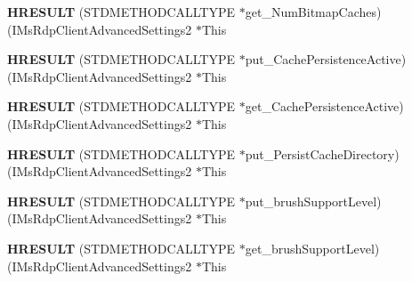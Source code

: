 \begin{DoxyCompactItemize}
\item 
\mbox{\label{struct_i_ms_rdp_client_advanced_settings2_vtbl_a17f2940a7e8ea17c9e679a1cb39da5b5}} 
{\bfseries H\+R\+E\+S\+U\+LT} (S\+T\+D\+M\+E\+T\+H\+O\+D\+C\+A\+L\+L\+T\+Y\+PE $\ast$get\+\_\+\+Num\+Bitmap\+Caches)(I\+Ms\+Rdp\+Client\+Advanced\+Settings2 $\ast$This
\item 
\mbox{\label{struct_i_ms_rdp_client_advanced_settings2_vtbl_a521bdd1f847274bd15432cf4052db173}} 
{\bfseries H\+R\+E\+S\+U\+LT} (S\+T\+D\+M\+E\+T\+H\+O\+D\+C\+A\+L\+L\+T\+Y\+PE $\ast$put\+\_\+\+Cache\+Persistence\+Active)(I\+Ms\+Rdp\+Client\+Advanced\+Settings2 $\ast$This
\item 
\mbox{\label{struct_i_ms_rdp_client_advanced_settings2_vtbl_a0a0d2c0b8585a6179e127e3e5e9a7b68}} 
{\bfseries H\+R\+E\+S\+U\+LT} (S\+T\+D\+M\+E\+T\+H\+O\+D\+C\+A\+L\+L\+T\+Y\+PE $\ast$get\+\_\+\+Cache\+Persistence\+Active)(I\+Ms\+Rdp\+Client\+Advanced\+Settings2 $\ast$This
\item 
\mbox{\label{struct_i_ms_rdp_client_advanced_settings2_vtbl_abddce74b590f074eb6a0cdf5706a206e}} 
{\bfseries H\+R\+E\+S\+U\+LT} (S\+T\+D\+M\+E\+T\+H\+O\+D\+C\+A\+L\+L\+T\+Y\+PE $\ast$put\+\_\+\+Persist\+Cache\+Directory)(I\+Ms\+Rdp\+Client\+Advanced\+Settings2 $\ast$This
\item 
\mbox{\label{struct_i_ms_rdp_client_advanced_settings2_vtbl_a1721c520ae137735e899b5532c357e79}} 
{\bfseries H\+R\+E\+S\+U\+LT} (S\+T\+D\+M\+E\+T\+H\+O\+D\+C\+A\+L\+L\+T\+Y\+PE $\ast$put\+\_\+brush\+Support\+Level)(I\+Ms\+Rdp\+Client\+Advanced\+Settings2 $\ast$This
\item 
\mbox{\label{struct_i_ms_rdp_client_advanced_settings2_vtbl_a50fc6060014832dda23386b8c0dc2460}} 
{\bfseries H\+R\+E\+S\+U\+LT} (S\+T\+D\+M\+E\+T\+H\+O\+D\+C\+A\+L\+L\+T\+Y\+PE $\ast$get\+\_\+brush\+Support\+Level)(I\+Ms\+Rdp\+Client\+Advanced\+Settings2 $\ast$This
\item 
\mbox{\label{struct_i_ms_rdp_client_advanced_settings2_vtbl_af560cf284f3c2b7a51f9f3785ad65a56}} 

\end{DoxyCompactItemize}
